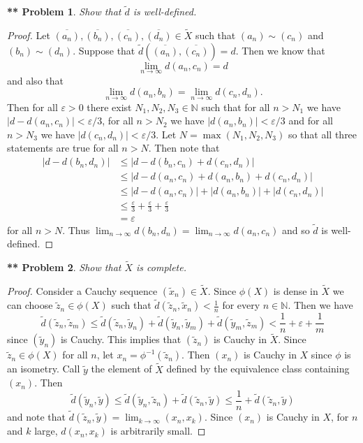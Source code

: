 \documentclass{article}
\newtheorem{**}{** Problem}
\begin{document}
\begin{flushleft}
\begin{**}
Show that $\widetilde{d}$ is well-defined.
\end{**}
\begin{proof}
Let $\overline{(a_n)}, \overline{(b_n)}, \overline{(c_n)}, \overline{(d_n)} \in \widetilde{X}$ such that $(a_n) \sim (c_n)$ and $(b_n) \sim (d_n)$. Suppose that $\widetilde{d} (\overline{(a_n)}, \overline{(c_n)}) = d$. Then we know that
\[
\lim_{n \rightarrow \infty} d(a_n, c_n) = d
\]
and also that
\[
\lim_{n \rightarrow \infty} d(a_n, b_n) = \lim_{n \rightarrow \infty} d(c_n, d_n).
\]
Then for all $\varepsilon > 0$ there exist $N_1, N_2, N_3 \in \mathbb{N}$ such that for all $n > N_1$ we have $|d - d(a_n, c_n)| < \varepsilon/3$, for all $n > N_2$ we have $|d(a_n, b_n)| < \varepsilon/3$ and for all $n > N_3$ we have $|d(c_n, d_n)| < \varepsilon/3$. Let $N = \max (N_1, N_2, N_3)$ so that all three statements are true for all $n > N$. Then note that
\begin{align*}
|d - d(b_n, d_n)|
& \leq |d - d(b_n, c_n) + d(c_n, d_n)|\\
& \leq |d - d(a_n, c_n) + d(a_n, b_n) + d(c_n, d_n)|\\
& \leq |d - d(a_n, c_n)| + |d(a_n, b_n)| + |d(c_n, d_n)|\\
& \leq \frac{\varepsilon}{3} + \frac{\varepsilon}{3} + \frac{\varepsilon}{3}\\
& = \varepsilon
\end{align*}
for all $n > N$. Thus $\lim_{n \rightarrow \infty} d(b_n, d_n) = \lim_{n \rightarrow \infty} d(a_n, c_n)$ and so $\widetilde{d}$ is well-defined.
\end{proof}

\begin{**}
Show that $\widetilde{X}$ is complete.
\end{**}
\begin{proof}
Consider a Cauchy sequence $(\widetilde{x}_n) \in \widetilde{X}$. Since $\phi(X)$ is dense in $\widetilde{X}$ we can choose $\widetilde{z}_n \in \phi(X)$ such that $\widetilde{d} (\widetilde{z}_n, \widetilde{x}_n) < \frac{1}{n}$ for every $n \in \mathbb{N}$. Then we have
\[
\widetilde{d} (\widetilde{z}_n, \widetilde{z}_m) \leq \widetilde{d} (\widetilde{z}_n, \widetilde{y}_n) + \widetilde{d} (\widetilde{y}_n, \widetilde{y}_m) + \widetilde{d} (\widetilde{y}_m, \widetilde{z}_m) < \frac{1}{n} + \varepsilon + \frac{1}{m}
\]
since $(\widetilde{y}_n)$ is Cauchy. This implies that $(\widetilde{z}_n)$ is Cauchy in $\widetilde{X}$. Since $\widetilde{z}_n \in \phi (X)$ for all $n$, let $x_n = \phi^{-1} (\widetilde{z}_n)$. Then $(x_n)$ is Cauchy in $X$ since $\phi$ is an isometry. Call $\widetilde{y}$ the element of $\widetilde{X}$ defined by the equivalence class containing $(x_n)$. Then
\[
\widetilde{d} (\widetilde{y}_n, \widetilde{y}) \leq \widetilde{d} (\widetilde{y}_n, \widetilde{z}_n) + \widetilde{d} (\widetilde{z}_n, \widetilde{y}) \leq \frac{1}{n} + \widetilde{d} (\widetilde{z}_n, \widetilde{y})
\]
and note that $\widetilde{d} (\widetilde{z}_n, \widetilde{y}) = \lim_{k \rightarrow \infty} (x_n, x_k)$. Since $(x_n)$ is Cauchy in $X$, for $n$ and $k$ large, $d(x_n, x_k)$ is arbitrarily small.
\end{proof}


\end{flushleft}
\end{document}

